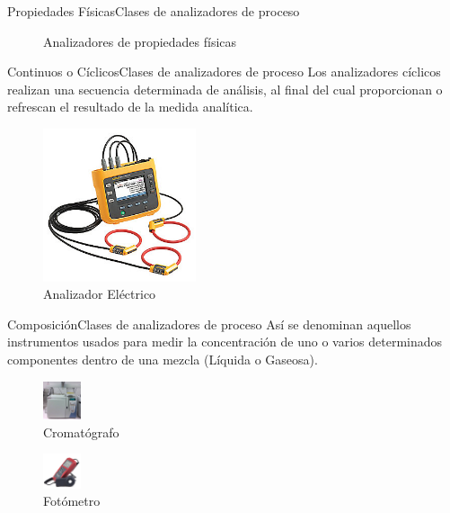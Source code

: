 \documentclass[10pt]{beamer}
\begin{document}
{\begin{frame}{Propiedades Físicas}{Clases de analizadores de proceso}
\begin{figure}
\caption{\label{fig:6}Analizadores de propiedades físicas} %
\end{figure}
\end{frame}  
  \begin{frame}{Continuos o Cíclicos}{Clases de analizadores de proceso}
Los analizadores cíclicos realizan una secuencia determinada de análisis, al final del cual proporcionan o refrescan el resultado de la medida analítica.      
\begin{figure}%
\includegraphics[width=0.4\textwidth]{figura_11.jpg} %
\caption{\label{fig:7}Analizador Eléctrico} %
\end{figure}
\end{frame}  
 \begin{frame}{Composición}{Clases de analizadores de proceso}
Así se denominan aquellos instrumentos usados para medir la concentración de uno o varios determinados componentes dentro de una mezcla (Líquida o Gaseosa).     
\begin{figure}%
\includegraphics[width=0.1\textwidth]{figura_12.png} %
\caption{\label{fig:8}Cromatógrafo} %
\end{figure}
\begin{figure}%
\includegraphics[width=0.1\textwidth]{figura_13.jpg} %
\caption{\label{fig:9}Fotómetro} %

\end{figure}
\end{frame}}
\end{document}
